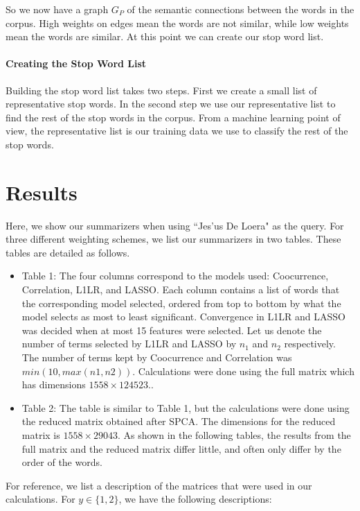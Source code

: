 \documentclass{article}
\begin{document}
So we now have a graph $G_P$ of the semantic connections between the words in the corpus.  High weights on edges mean the words are not similar, while low weights mean the words are similar.  At this point we can create our stop word list.

\paragraph{Creating the Stop Word List}  Building the stop word list takes two steps.  First we create a small list of representative stop words.  In the second step we use our representative list to find the rest of the stop words in the corpus.  From a machine learning point of view, the representative list is our training data we use to classify the rest of the stop words.

\section{Results} \label{sec:results}
Here, we show our summarizers when using ``Jes\a'us De Loera" as the query. For three different weighting schemes, we list our summarizers in two tables. These tables are detailed as follows.
\begin{itemize}
\item Table 1: The four columns correspond to the models used: Coocurrence, Correlation, L1LR, and LASSO. Each column contains a list of words that the corresponding model selected, ordered from top to bottom by what the model selects as most to least significant. Convergence in L1LR and LASSO was decided when at most 15 features were selected. Let us denote the number of terms selected by L1LR and LASSO by $n_{1}$ and $n_{2}$ respectively. The number of terms kept by Coocurrence and Correlation was $min(10, max(n1, n2))$. Calculations were done using the full matrix which has dimensions $1558 \times 124523$..
\item Table 2: The table is similar to Table 1, but the calculations were done using the reduced matrix obtained after SPCA. The dimensions for the reduced matrix is $1558 \times 29043$. As shown in the following tables, the results from the full matrix and the reduced matrix differ little, and often only differ by the order of the words.
\end{itemize}

For reference, we list a description of the matrices that were used in our calculations. For $y\in \{1,2\}$, we have the following descriptions:
\end{document}
